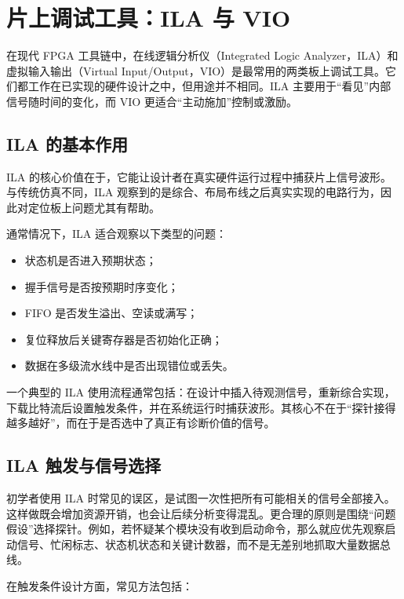 \section{片上调试工具：ILA 与
VIO}\label{ux7247ux4e0aux8c03ux8bd5ux5de5ux5177ila-ux4e0e-vio}

在现代 FPGA 工具链中，在线逻辑分析仪（Integrated Logic
Analyzer，ILA）和虚拟输入输出（Virtual
Input/Output，VIO）是最常用的两类板上调试工具。它们都工作在已实现的硬件设计之中，但用途并不相同。ILA
主要用于``看见''内部信号随时间的变化，而 VIO
更适合``主动施加''控制或激励。

\subsection{ILA 的基本作用}\label{ila-ux7684ux57faux672cux4f5cux7528}

ILA
的核心价值在于，它能让设计者在真实硬件运行过程中捕获片上信号波形。与传统仿真不同，ILA
观察到的是综合、布局布线之后真实实现的电路行为，因此对定位板上问题尤其有帮助。

通常情况下，ILA 适合观察以下类型的问题：

\begin{itemize}
\tightlist
\item
  状态机是否进入预期状态；
\item
  握手信号是否按预期时序变化；
\item
  FIFO 是否发生溢出、空读或满写；
\item
  复位释放后关键寄存器是否初始化正确；
\item
  数据在多级流水线中是否出现错位或丢失。
\end{itemize}

一个典型的 ILA
使用流程通常包括：在设计中插入待观测信号，重新综合实现，下载比特流后设置触发条件，并在系统运行时捕获波形。其核心不在于``探针接得越多越好''，而在于是否选中了真正有诊断价值的信号。

\subsection{ILA
触发与信号选择}\label{ila-ux89e6ux53d1ux4e0eux4fe1ux53f7ux9009ux62e9}

初学者使用 ILA
时常见的误区，是试图一次性把所有可能相关的信号全部接入。这样做既会增加资源开销，也会让后续分析变得混乱。更合理的原则是围绕``问题假设''选择探针。例如，若怀疑某个模块没有收到启动命令，那么就应优先观察启动信号、忙闲标志、状态机状态和关键计数器，而不是无差别地抓取大量数据总线。

在触发条件设计方面，常见方法包括：

